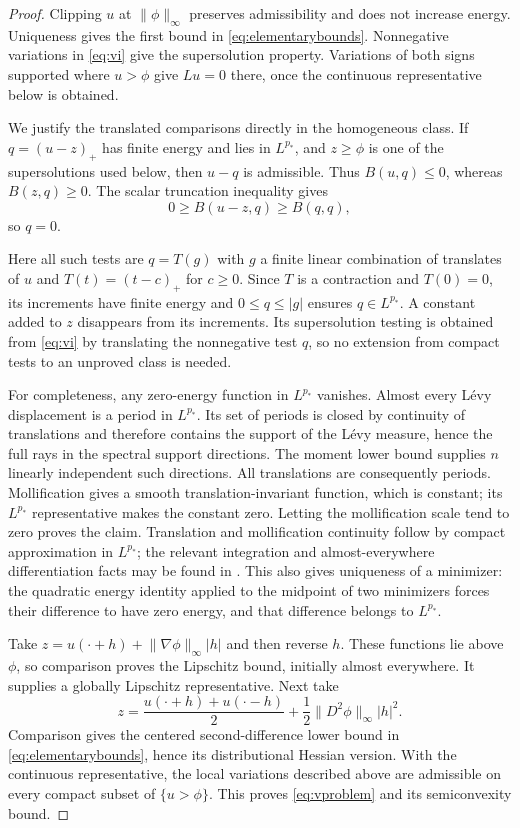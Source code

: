 \documentclass[11pt]{article}
\numberwithin{equation}{section}
\theoremstyle{remark}
\newcommand{\norm}[1]{\lVert #1\rVert}
\newcommand{\abs}[1]{\lvert #1\rvert}
\begin{document}
\begin{proof}
Clipping $u$ at $\norm\phi_\infty$ preserves admissibility and does not increase energy. Uniqueness gives the first bound in \eqref{eq:elementarybounds}. Nonnegative variations in \eqref{eq:vi} give the supersolution property. Variations of both signs supported where $u>\phi$ give $Lu=0$ there, once the continuous representative below is obtained.

We justify the translated comparisons directly in the homogeneous class. If $q=(u-z)_+$ has finite energy and lies in $L^{p_*}$, and $z\ge\phi$ is one of the supersolutions used below, then $u-q$ is admissible. Thus $B(u,q)\le0$, whereas $B(z,q)\ge0$. The scalar truncation inequality gives
\begin{equation}\label{eq:truncation}
 0\ge B(u-z,q)\ge B(q,q),
\end{equation}
so $q=0$.

Here all such tests are $q=T(g)$ with $g$ a finite linear combination of translates of $u$ and $T(t)=(t-c)_+$ for $c\ge0$. Since $T$ is a contraction and $T(0)=0$, its increments have finite energy and $0\le q\le\abs g$ ensures $q\in L^{p_*}$. A constant added to $z$ disappears from its increments. Its supersolution testing is obtained from \eqref{eq:vi} by translating the nonnegative test $q$, so no extension from compact tests to an unproved class is needed.

For completeness, any zero-energy function in $L^{p_*}$ vanishes. Almost every L\'evy displacement is a period in $L^{p_*}$. Its set of periods is closed by continuity of translations and therefore contains the support of the L\'evy measure, hence the full rays in the spectral support directions. The moment lower bound supplies $n$ linearly independent such directions. All translations are consequently periods. Mollification gives a smooth translation-invariant function, which is constant; its $L^{p_*}$ representative makes the constant zero. Letting the mollification scale tend to zero proves the claim. Translation and mollification continuity follow by compact approximation in $L^{p_*}$; the relevant integration and almost-everywhere differentiation facts may be found in \cite{TaoMeasure}. This also gives uniqueness of a minimizer: the quadratic energy identity applied to the midpoint of two minimizers forces their difference to have zero energy, and that difference belongs to $L^{p_*}$.

Take $z=u(\cdot+h)+\norm{\nabla\phi}_\infty\abs h$ and then reverse $h$. These functions lie above $\phi$, so comparison proves the Lipschitz bound, initially almost everywhere. It supplies a globally Lipschitz representative. Next take
\[
 z=\frac{u(\cdot+h)+u(\cdot-h)}2
   +\frac12\norm{D^2\phi}_\infty\abs h^2.
\]
Comparison gives the centered second-difference lower bound in \eqref{eq:elementarybounds}, hence its distributional Hessian version. With the continuous representative, the local variations described above are admissible on every compact subset of $\{u>\phi\}$. This proves \eqref{eq:vproblem} and its semiconvexity bound.


\end{proof}
\end{document}
